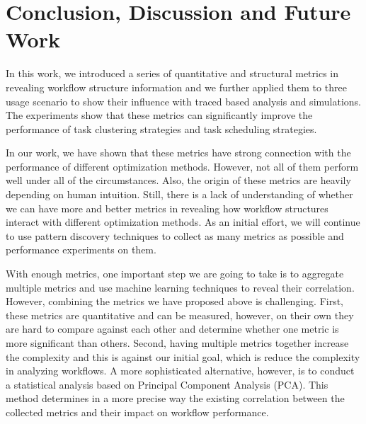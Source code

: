 \documentclass[final,5p,times,twocolumn]{elsarticle}
\begin{document}






\section{Conclusion, Discussion and Future Work}

In this work, we introduced a series of quantitative and structural metrics in revealing workflow structure information and we further applied them to three usage scenario to show their influence with traced based analysis and simulations. The experiments show that these metrics can significantly improve the performance of task clustering strategies and task scheduling strategies.   

In our work, we have shown that these metrics have strong connection with the performance of different optimization methods. However, not all of them perform well under all of the circumstances. Also, the origin of these metrics are heavily depending on human intuition. Still, there is a lack of understanding of whether we can have more and better metrics in revealing how workflow structures interact with different optimization methods. As an initial effort, we will continue to use pattern discovery techniques to collect as many metrics as possible and performance experiments on them. 

With enough metrics, one important step we are going to take is to aggregate multiple metrics and use machine learning techniques to reveal their correlation. However, combining the metrics we have proposed above is challenging. First, these metrics are quantitative and can be measured, however, on their own they are hard to compare against each other and determine whether one metric is more significant than others. Second,  having multiple metrics together increase the complexity and this is against our initial goal, which is reduce the complexity in analyzing workflows. A more sophisticated alternative, however, is to conduct a statistical analysis based on Principal Component Analysis (PCA). This method determines in a more precise way the existing correlation between the collected metrics and their impact on workflow performance.
\end{document}

